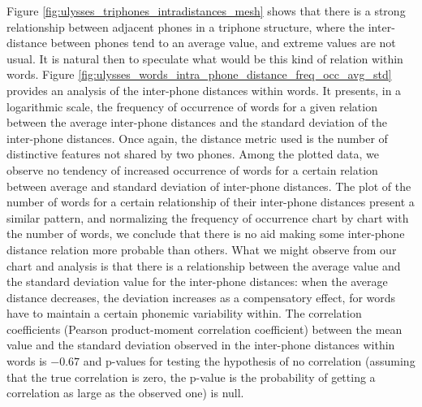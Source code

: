 Figure \ref{fig:ulysses_triphones_intradistances_mesh} shows that there is a strong relationship 
between adjacent phones in a triphone structure, where the inter-distance between phones tend to
an average value, and extreme values are not usual. It is natural then to speculate what would be
this kind of relation within words. Figure \ref{fig:ulysses_words_intra_phone_distance_freq_occ_avg_std}
provides an analysis of the inter-phone distances within words. It presents, in a logarithmic scale,
the frequency of occurrence of words for a given relation between the average inter-phone distances and 
the standard deviation of the inter-phone distances. Once again, the distance metric used is the number
of distinctive features not shared by two phones. Among the plotted data, we observe no tendency of increased
occurrence of words for a certain relation between average and standard deviation of inter-phone distances.
The plot of the number of words for a certain relationship of their inter-phone distances present a similar
pattern, and normalizing the frequency of occurrence chart by chart with the number of words, we
conclude that there is no aid making some inter-phone distance relation more probable than others.
What we might observe from our chart and analysis is that there is a relationship between the
average value and the standard deviation value for the inter-phone distances: when the average distance
decreases, the deviation increases as a compensatory effect, for words have to maintain a certain phonemic 
variability within. The correlation coefficients (Pearson product-moment correlation coefficient)
between the mean value and the standard deviation observed in the inter-phone distances within words
is $-0.67$ and p-values for testing the hypothesis of no correlation
(assuming that the true correlation is zero, the p-value is the probability of getting a correlation as large 
as the observed one)
is null.


